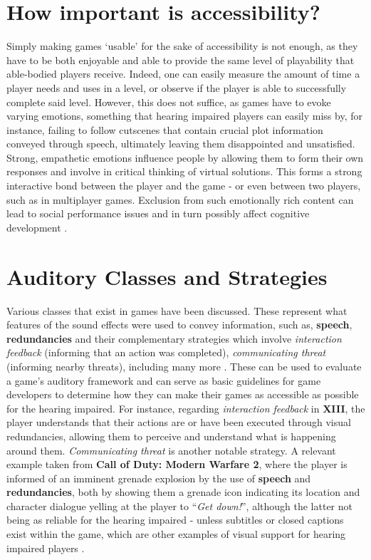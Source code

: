 \documentclass{scrartcl}
\begin{document}
\section{How important is accessibility?}
Simply making games `usable' for the sake of accessibility is not enough, as they have to be both enjoyable and able to provide the same level of playability that able-bodied players receive. Indeed, one can easily measure the amount of time a player needs and uses in a level, or observe if the player is able to successfully complete said level. \cite{Arch} However, this does not suffice, as games have to evoke varying emotions, something that hearing impaired players can easily miss by, for instance, failing to follow cutscenes that contain crucial plot information conveyed through speech, ultimately leaving them disappointed and unsatisfied. Strong, empathetic emotions influence people by allowing them to form their own responses and involve in critical thinking of virtual solutions. This forms a strong interactive bond between the player and the game - or even between two players, such as in multiplayer games. Exclusion from such emotionally rich content can lead to social performance issues and in turn possibly affect cognitive development \cite{Sebanz} \cite{Chartrand}.

\section{Auditory Classes and Strategies}
Various classes that exist in games have been discussed. These represent what features of the sound effects were used to convey information, such as, \textbf{speech}, \textbf{redundancies} and their complementary strategies which involve \textit{interaction feedback} (informing that an action was completed), \textit{communicating threat} (informing nearby threats), including many more \cite{Flav} \cite{Denise}. These can be used to evaluate a game's auditory framework and can serve as basic guidelines for game developers to determine how they can make their games as accessible as possible for the hearing impaired. For instance, regarding \textit{interaction feedback} in \textbf{XIII}, the player understands that their actions are or have been executed through visual redundancies, allowing them to perceive and understand what is happening around them. \textit{Communicating threat} is another notable strategy. A relevant example taken from \textbf{Call of Duty: Modern Warfare 2}, where the player is informed of an imminent grenade explosion by the use of \textbf{speech} and \textbf{redundancies}, both by showing them a grenade icon indicating its location and character dialogue yelling at the player to  ``\textit{Get down!}'', although the latter not being as reliable for the hearing impaired - unless subtitles or closed captions exist within the game, which are other examples of visual support for hearing impaired players \cite{Denise}.
\end{document}
